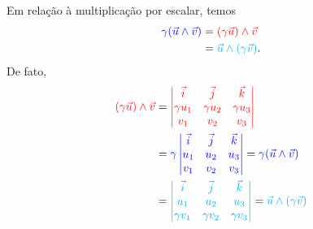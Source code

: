 Em relação à multiplicação por escalar, temos
\begin{align}
  {\color{blue}\gamma(\vec{u}\land\vec{v})} &= {\color{red}(\gamma\vec{u})\land\vec{v}} \\
                              &= {\color{cyan}\vec{u}\land(\gamma\vec{v})}.
\end{align}
De fato,
\begin{align}
  {\color{red}(\gamma\vec{u})\land\vec{v}} &=
                                {\color{red}\begin{vmatrix}
                                  \vec{i} & \vec{j} & \vec{k} \\
                                  \gamma u_1 & \gamma u_2 & \gamma u_3\\
                                  v_1 & v_2 & v_3
                                \end{vmatrix}} \\
                              &= {\color{blue}\gamma\begin{vmatrix}
                                  \vec{i} & \vec{j} & \vec{k} \\
                                  u_1 & u_2 & u_3\\
                                  v_1 & v_2 & v_3
                                \end{vmatrix}} = {\color{blue}\gamma(\vec{u}\land\vec{v})}\\
                              &=
                                {\color{cyan}\begin{vmatrix}
                                  \vec{i} & \vec{j} & \vec{k} \\
                                  u_1 & u_2 & u_3\\
                                  \gamma v_1 & \gamma v_2 & \gamma v_3
                                \end{vmatrix}} = {\color{cyan}\vec{u}\land(\gamma\vec{v})}
\end{align}

